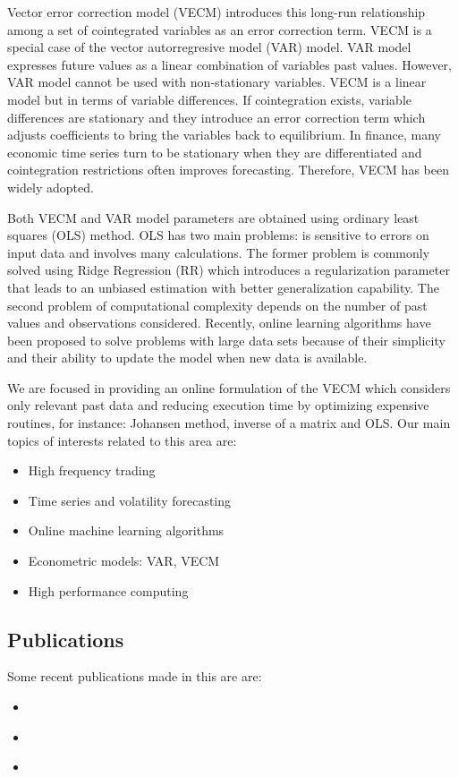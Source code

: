 Vector error correction model (VECM) introduces this long-run relationship among
a set of cointegrated variables as an error correction term. VECM is a special
case of the vector autorregresive model (VAR) model. VAR model expresses future
values as a linear combination of variables past values.  However, VAR model
cannot be used with non-stationary variables. VECM is a linear model but in
terms of variable differences. If cointegration exists, variable differences are
stationary and they introduce an error correction term which adjusts
coefficients to bring the variables back to equilibrium. In finance, many
economic time series turn to be stationary when they are differentiated and
cointegration restrictions often improves forecasting. Therefore, VECM has been
widely adopted.

Both VECM and VAR model parameters are obtained using ordinary least squares
(OLS) method. OLS has two main problems: is sensitive to errors on input data
and involves many calculations. The former problem is commonly solved using
Ridge Regression (RR) which introduces a regularization parameter that leads to
an unbiased estimation with better generalization capability. The second problem
of computational complexity depends on the number of past values and
observations considered.  Recently, online learning algorithms have been
proposed to solve problems with large data sets because of their simplicity and
their ability to update the model when new data is available. 

We are focused in providing an online formulation of the VECM which considers
only relevant past data and reducing execution time by optimizing expensive
routines, for instance: Johansen method, inverse of a matrix and OLS.  Our main
topics of interests related to this area are:

\begin{itemize}
\item High frequency trading
\item Time series and volatility forecasting
\item Online machine learning algorithms
\item Econometric models: VAR, VECM
\item High performance computing
\end{itemize}


\subsection{Publications}
Some recent publications made in this are are:
\begin{itemize}
\item \cite{arceetAl2015}
\item \cite{arce+salinas2012}
\item \cite{arceetAl2012}
\end{itemize}
